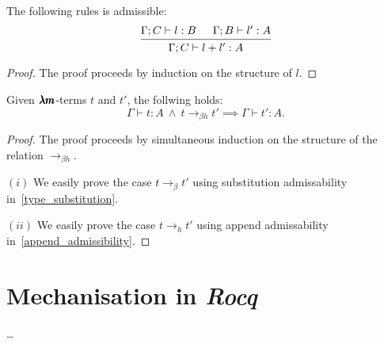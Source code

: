 \begin{lemma}
  \label{append_is_admissible}
  The following rules is admissible:
  \[
    \begin{prooftree}
      \hypo{ \Gamma ; C \vdash l:B }
      \hypo{ \Gamma ; B \vdash l':A }
      \infer2{ \Gamma ; C \vdash  l+l' : A }
    \end{prooftree}
  \]
\end{lemma}
\begin{proof}
  The proof proceeds by induction on the structure of $l$.
\end{proof}


\begin{theorem}
  \label{type_preservation}
  Given $\pmb{\lambda m}$-terms $t$ and $t'$, the follwing holds:
  \[
    \Gamma \vdash t : A \ \land \ t \to_{\beta h} t' \implies \Gamma \vdash t' : A.
  \]
\end{theorem}
\begin{proof}
  The proof proceeds by simultaneous induction on the structure of the relation $\to_{\beta h}$.

  $(i)$ We easily prove the case $t \to_\beta t'$ using substitution admissability in~\cref{type_substitution}.

  $(ii)$ We easily prove the case $t \to_h t'$ using append admissability in~\cref{append_admissibility}.
\end{proof}


\section{Mechanisation in \textit{Rocq}}

\dots


